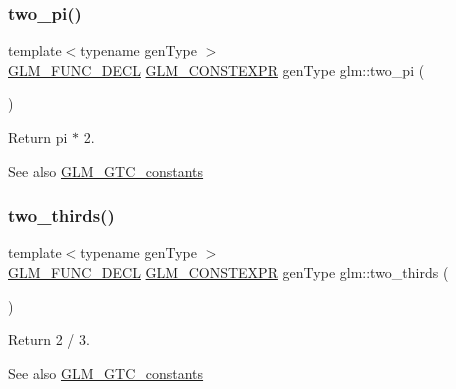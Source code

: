 \subsubsection{\texorpdfstring{two\+\_\+pi()}{two\_pi()}}
{\footnotesize\ttfamily template$<$typename gen\+Type $>$ \\
\mbox{\hyperlink{setup_8hpp_ab2d052de21a70539923e9bcbf6e83a51}{G\+L\+M\+\_\+\+F\+U\+N\+C\+\_\+\+D\+E\+CL}} \mbox{\hyperlink{setup_8hpp_a08b807947b47031d3a511f03f89645ad}{G\+L\+M\+\_\+\+C\+O\+N\+S\+T\+E\+X\+PR}} gen\+Type glm\+::two\+\_\+pi (\begin{DoxyParamCaption}{ }\end{DoxyParamCaption})}

Return pi $\ast$ 2. \begin{DoxySeeAlso}{See also}
\mbox{\hyperlink{group__gtc__constants}{G\+L\+M\+\_\+\+G\+T\+C\+\_\+constants}} 
\end{DoxySeeAlso}
\mbox{\label{group__gtc__constants_ga9b4d2f4322edcf63a6737b92a29dd1f5}} 
\subsubsection{\texorpdfstring{two\+\_\+thirds()}{two\_thirds()}}
{\footnotesize\ttfamily template$<$typename gen\+Type $>$ \\
\mbox{\hyperlink{setup_8hpp_ab2d052de21a70539923e9bcbf6e83a51}{G\+L\+M\+\_\+\+F\+U\+N\+C\+\_\+\+D\+E\+CL}} \mbox{\hyperlink{setup_8hpp_a08b807947b47031d3a511f03f89645ad}{G\+L\+M\+\_\+\+C\+O\+N\+S\+T\+E\+X\+PR}} gen\+Type glm\+::two\+\_\+thirds (\begin{DoxyParamCaption}{ }\end{DoxyParamCaption})}

Return 2 / 3. \begin{DoxySeeAlso}{See also}
\mbox{\hyperlink{group__gtc__constants}{G\+L\+M\+\_\+\+G\+T\+C\+\_\+constants}} 
\end{DoxySeeAlso}
\mbox{\label{group__gtc__constants_ga788f5a421fc0f40a1296ebc094cbaa8a}} 
